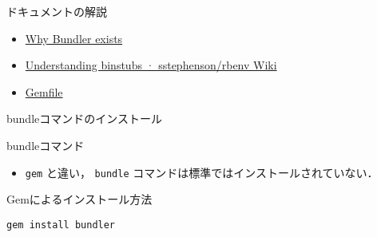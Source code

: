 \documentclass[t, aspectratio=169]{beamer}
\begin{document}
\begin{frame}[label=sec-4-2-2]{ドキュメントの解説}
\begin{itemize}
\item \href{http://bundler.io/rationale.html}{Why Bundler exists}
\item \href{https://github.com/sstephenson/rbenv/wiki/Understanding-binstubs}{Understanding binstubs · sstephenson/rbenv Wiki}
\item \href{http://bundler.io/gemfile.html}{Gemfile}
\end{itemize}
\end{frame}

\begin{frame}[fragile,label=sec-4-2-3]{bundleコマンドのインストール}
 \begin{block}{bundleコマンド}
\begin{itemize}
\item \texttt{gem} と違い， \texttt{bundle} コマンドは標準ではインストールされていない．
\end{itemize}
\end{block}

\begin{block}{Gemによるインストール方法}
\begin{verbatim}
gem install bundler
\end{verbatim}
\end{block}
\end{frame}
\end{document}
